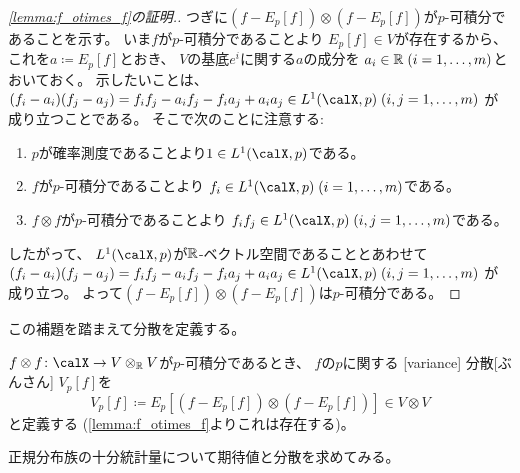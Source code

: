 \documentclass[report]{jlreq}
\begin{document}
\begin{proof}[\cref{lemma:f_otimes_f}の証明.]
    つぎに$(f - E_p[f]) \otimes (f - E_p[f])$が$p$-可積分であることを示す。
    いま$f$が$p$-可積分であることより
    $E_p[f] \in V$が存在するから、
    これを$a \coloneqq E_p[f]$とおき、
    $V$の基底$e^i$に関する$a$の成分を
    $a_i \in \mathbb{R} \; (i = 1, \dots, m)$とおいておく。
    示したいことは、
    $(f_i - a_i)(f_j - a_j)
        = f_i f_j - a_i f_j - f_i a_j + a_i a_j
        \in L^1(\calX, p) \; (i, j = 1, \dots, m)$
    が成り立つことである。
    そこで次のことに注意する:
    \begin{enumerate}[label=(\roman*)]
        \item $p$が確率測度であることより$1 \in L^1(\calX, p)$である。
        \item $f$が$p$-可積分であることより
            $f_i \in L^1(\calX, p) \; (i = 1, \dots, m)$である。
        \item $f \otimes f$が$p$-可積分であることより
            $f_i f_j
                \in L^1(\calX, p) \;
                (i, j = 1, \dots, m)$である。
    \end{enumerate}
    したがって、
    $L^1(\calX, p)$が$\mathbb{R}$-ベクトル空間であることとあわせて
    $(f_i - a_i)(f_j - a_j)
        = f_i f_j - a_i f_j - f_i a_j + a_i a_j
        \in L^1(\calX, p) \; (i, j = 1, \dots, m)$
    が成り立つ。
    よって$(f - E_p[f]) \otimes (f - E_p[f])$は$p$-可積分である。
\end{proof}

この補題を踏まえて分散を定義する。

\begin{definition}[分散]
    $f \otimes f \colon \calX \to V \otimes_\R V$が$p$-可積分であるとき、
    $f$の$p$に関する
    [variance]
        {分散}[ぶんさん]
    $V_p[f]$を
    \begin{equation}
        V_p[f]
            \coloneqq E_p[(f - E_p[f]) \otimes (f - E_p[f])]
            \in V \otimes V
    \end{equation}
    と定義する
    (\cref{lemma:f_otimes_f}よりこれは存在する)。
\end{definition}

正規分布族の十分統計量について期待値と分散を求めてみる。
\end{document}
